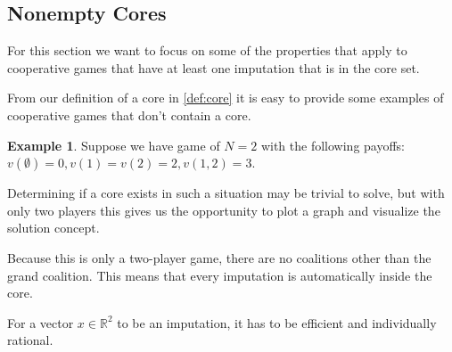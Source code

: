 \documentclass[10pt,a4paper,titlepage]{article}
\theoremstyle{plain}
\theoremstyle{definition}
\newtheorem{example}[thm]{Example} %
\begin{document}
 \subsection{Nonempty Cores}
 For this section we want to focus on some of the properties that apply to cooperative games that have at least one imputation that is in the core set.

 From our definition of a core in \ref{def:core} it is easy to provide some examples of cooperative games that don't contain a core.

 \begin{example}
    Suppose we have game of $N = 2$ with the following payoffs: $v(\emptyset) = 0, v(1) = v(2) = 2, v(1, 2) = 3$.

    Determining if a core exists in such a situation may be trivial to solve, but with only two players this gives us the opportunity to plot a graph and visualize the solution concept.
    
    Because this is only a two-player game, there are no coalitions other than the grand coalition. This means that every imputation is automatically inside the core.

    For a vector $x \in \mathbb{R}^2$ to be an imputation, it has to be efficient and individually rational.

 \end{example}

 
\end{document}
